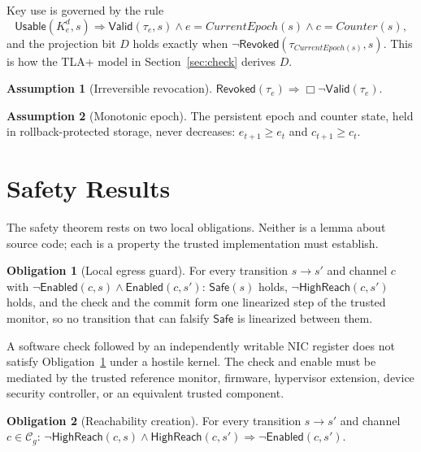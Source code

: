 \documentclass[11pt,letterpaper]{article}
\theoremstyle{plain}
\theoremstyle{definition}
\newtheorem{assumption}{Assumption}
\newtheorem{obligation}{Obligation}
\newcommand{\HR}{\mathsf{HighReach}}
\newcommand{\En}{\mathsf{Enabled}}
\newcommand{\Safe}{\mathsf{Safe}}
\newcommand{\Usable}{\mathsf{Usable}}
\newcommand{\Valid}{\mathsf{Valid}}
\newcommand{\Revoked}{\mathsf{Revoked}}
\newcommand{\Cg}{\mathcal{C}_g}
\begin{document}
Key use is governed by the rule
\begin{equation}\label{eq:keyuse}
\Usable(K^{d}_{e}, s) \Rightarrow \Valid(\tau_e, s) \wedge e = \mathit{CurrentEpoch}(s) \wedge c = \mathit{Counter}(s),
\end{equation}
and the projection bit $D$ holds exactly when $\neg\Revoked(\tau_{\mathit{CurrentEpoch}(s)}, s)$. This is how the TLA+ model in Section~\ref{sec:check} derives $D$.

\begin{assumption}[Irreversible revocation]\label{as:revoke}
$\Revoked(\tau_e) \Rightarrow \Box\neg\Valid(\tau_e)$.
\end{assumption}

\begin{assumption}[Monotonic epoch]\label{as:mono}
The persistent epoch and counter state, held in rollback-protected storage, never decreases: $e_{t+1} \ge e_t$ and $c_{t+1} \ge c_t$.
\end{assumption}

\section{Safety Results}\label{sec:safety}

The safety theorem rests on two local obligations. Neither is a lemma about source code; each is a property the trusted implementation must establish.

\begin{obligation}[Local egress guard]\label{ob:guard}
For every transition $s \to s'$ and channel $c$ with $\neg\En(c,s) \wedge \En(c,s')$: $\Safe(s)$ holds, $\neg\HR(c,s')$ holds, and the check and the commit form one linearized step of the trusted monitor, so no transition that can falsify $\Safe$ is linearized between them.
\end{obligation}

A software check followed by an independently writable NIC register does not satisfy Obligation~\ref{ob:guard} under a hostile kernel. The check and enable must be mediated by the trusted reference monitor, firmware, hypervisor extension, device security controller, or an equivalent trusted component.

\begin{obligation}[Reachability creation]\label{ob:create}
For every transition $s \to s'$ and channel $c \in \Cg$: $\neg\HR(c,s) \wedge \HR(c,s') \Rightarrow \neg\En(c,s')$.
\end{obligation}
\end{document}
